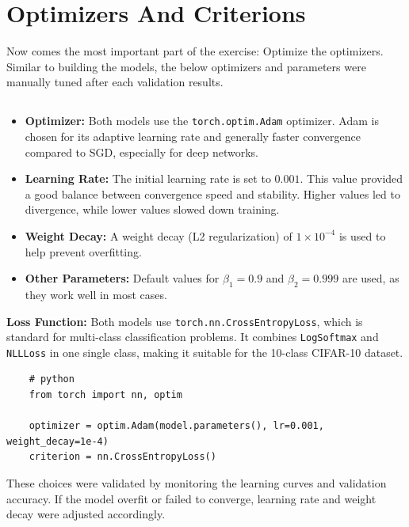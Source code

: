 \documentclass{report}
\begin{document}
\section{Optimizers And Criterions}
Now comes the most important part of the exercise: Optimize the optimizers. Similar to building the models, 
the below optimizers and parameters were manually tuned after each validation results.

\subsection{}

\begin{itemize}
    \item \textbf{Optimizer:} Both models use the \texttt{torch.optim.Adam} optimizer. Adam is chosen for its adaptive learning rate and generally faster convergence compared to SGD, especially for deep networks.
    \item \textbf{Learning Rate:} The initial learning rate is set to $0.001$. This value provided a good balance between convergence speed and stability. Higher values led to divergence, while lower values slowed down training.
    \item \textbf{Weight Decay:} A weight decay (L2 regularization) of $1 \times 10^{-4}$ is used to help prevent overfitting.
    \item \textbf{Other Parameters:} Default values for $\beta_1=0.9$ and $\beta_2=0.999$ are used, as they work well in most cases.
\end{itemize}

\textbf{Loss Function:} Both models use \texttt{torch.nn.CrossEntropyLoss}, which is standard for multi-class classification problems. It combines \texttt{LogSoftmax} and \texttt{NLLLoss} in one single class, making it suitable for the 10-class CIFAR-10 dataset.

\begin{verbatim}
    # python
    from torch import nn, optim

    optimizer = optim.Adam(model.parameters(), lr=0.001, weight_decay=1e-4)
    criterion = nn.CrossEntropyLoss()
\end{verbatim}

These choices were validated by monitoring the learning curves and validation accuracy. If the model overfit or failed to converge, learning rate and weight decay were adjusted accordingly.
 




\end{document}
